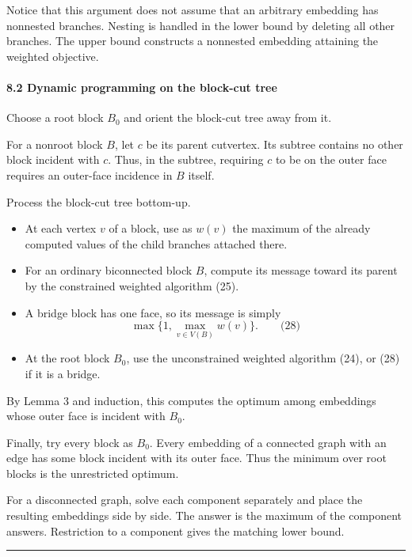 \documentclass[
  11pt,
  a4paper,
]{article}
\providecommand{\tightlist}{%
  \setlength{\itemsep}{0pt}\setlength{\parskip}{0pt}}
\begin{document}
Notice that this argument does not assume that an arbitrary embedding
has nonnested branches. Nesting is handled in the lower bound by
deleting all other branches. The upper bound constructs a nonnested
embedding attaining the weighted objective.

\paragraph{8.2 Dynamic programming on the block-cut
tree}\label{dynamic-programming-on-the-block-cut-tree}

Choose a root block \(B_0\) and orient the block-cut tree away from it.

For a nonroot block \(B\), let \(c\) be its parent cutvertex. Its
subtree contains no other block incident with \(c\). Thus, in the
subtree, requiring \(c\) to be on the outer face requires an outer-face
incidence in \(B\) itself.

Process the block-cut tree bottom-up.

\begin{itemize}
\tightlist
\item
  At each vertex \(v\) of a block, use as \(w(v)\) the maximum of the
  already computed values of the child branches attached there.
\item
  For an ordinary biconnected block \(B\), compute its message toward
  its parent by the constrained weighted algorithm (25).
\item
  A bridge block has one face, so its message is simply \[
  \max\{1,\max_{v\in V(B)}w(v)\}.
  \qquad\text{(28)}
  \]
\item
  At the root block \(B_0\), use the unconstrained weighted algorithm
  (24), or (28) if it is a bridge.
\end{itemize}

By Lemma 3 and induction, this computes the optimum among embeddings
whose outer face is incident with \(B_0\).

Finally, try every block as \(B_0\). Every embedding of a connected
graph with an edge has some block incident with its outer face. Thus the
minimum over root blocks is the unrestricted optimum.

For a disconnected graph, solve each component separately and place the
resulting embeddings side by side. The answer is the maximum of the
component answers. Restriction to a component gives the matching lower
bound.

\begin{center}\rule{0.5\linewidth}{0.5pt}\end{center}
\end{document}
